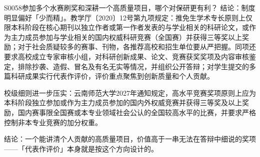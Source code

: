 \begin{qa}{S0058}{参加多个水赛刷奖和深耕一个高质量项目，哪个对保研更有利？}
结论：制度明显偏好「少而精」。教学厅〔2020〕12号第九项规定：推免生学术专长原则上仅限本科阶段在核心期刊以独立作者或第一作者发表的与学业相关的科研论文，或作为主力成员参加与学业相关的国内权威科研竞赛（全国赛）并获得三等奖以上奖励；对于社会质疑较多的赛事、刊物，各推荐高校和招生单位要从严把握。同项还要求高校成立专家审核小组，对科研创新成果、论文、竞赛获奖奖项及内容审核鉴定，排除抄袭、造假、冒名及有名无实等情况，并组织公开答辩；对学生提交的多篇科研成果实行代表作评价，评价重点聚焦到创新质量和个人贡献。

校级细则进一步压实：云南师范大学2027年通知规定，高水平竞赛奖项原则上应为本科阶段独立参加或作为主力成员参加的国内外权威竞赛并获得三等奖及以上奖励，国内赛事限全国赛或本专业领域社会公认的全国较高水平的比赛，并要求严格控制非本专业竞赛的加分权重。

结论：一个能讲清个人贡献的高质量项目，价值高于一串无法在答辩中细说的奖项——「代表作评价」本身就是按这个方向设计的。
\end{qa}

